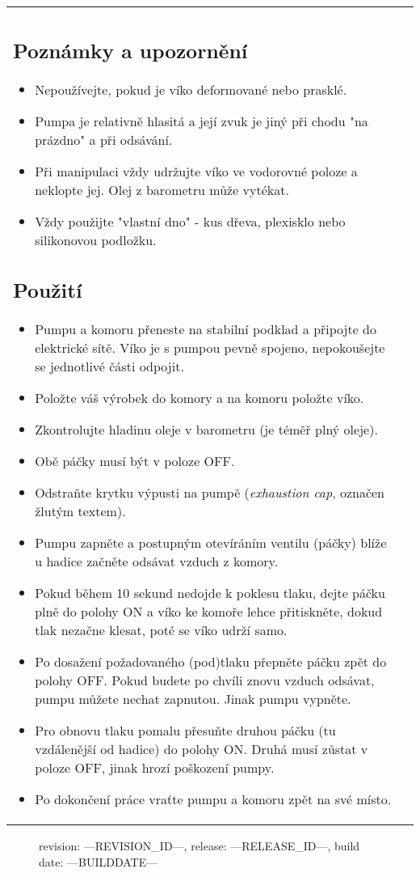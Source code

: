\documentclass[fleqn]{article}
\begin{document}
\begin{tabular}{@{}
                         p{}%
		         @{\hspace{.04\columnwidth}}%
		         p{}%
		         @{}%
}
\subsection{Poznámky a upozornění}
\begin{itemize}[noitemsep,topsep=0pt]
	\item Nepoužívejte, pokud je víko deformované nebo prasklé.
	\item Pumpa je relativně hlasitá a její zvuk je jiný při chodu "na prázdno" a při odsávání.
	\item Při manipulaci vždy udržujte víko ve vodorovné poloze a neklopte jej. Olej z barometru může vytékat.
	\item Vždy použijte "vlastní dno" - kus dřeva, plexisklo nebo silikonovou podložku.
\end{itemize}

\subsection{Použití}
\begin{itemize}[noitemsep,topsep=0pt]
	\item Pumpu a komoru přeneste na stabilní podklad a připojte do elektrické sítě. Víko je s pumpou pevně spojeno, nepokoušejte se jednotlivé části odpojit.
	\item Položte váš výrobek do komory a na komoru položte víko.
	\item Zkontrolujte hladinu oleje v barometru (je téměř plný oleje).
	\item Obě páčky musí být v poloze OFF.
	\item Odstraňte krytku výpusti na pumpě (\textit{exhaustion cap}, označen žlutým textem).
	\item Pumpu zapněte a postupným otevíráním ventilu (páčky) blíže u hadice začněte odsávat vzduch z komory.
	\item Pokud během 10 sekund nedojde k poklesu tlaku, dejte páčku plně do polohy ON a víko ke komoře lehce přitiskněte, dokud tlak nezačne klesat, poté se víko udrží samo.
	\item Po dosažení požadovaného (pod)tlaku přepněte páčku zpět do polohy OFF. Pokud budete po chvíli znovu vzduch odsávat, pumpu můžete nechat zapnutou. Jinak pumpu vypněte.
	\item Pro obnovu tlaku pomalu přesuňte druhou páčku (tu vzdálenější od hadice) do polohy ON. Druhá musí zůstat v poloze OFF, jinak hrozí poškození pumpy.
	\item Po dokončení práce vraťte pumpu a komoru zpět na své místo.
\end{itemize}



\end{tabular}

\vfill

\begin{figure}[b]
	\flushright
	\begin{itshape}
    revision: ---REVISION\_ID---, release: ---RELEASE\_ID---, build date: ---BUILDDATE---
	\end{itshape}
\end{figure}
\end{document}
